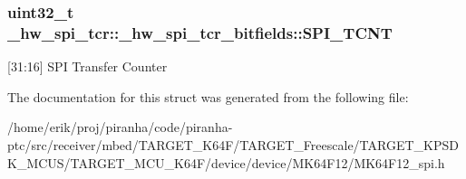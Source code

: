 \subsubsection[{\texorpdfstring{S\+P\+I\+\_\+\+T\+C\+NT}{SPI_TCNT}}]{\setlength{\rightskip}{0pt plus 5cm}uint32\+\_\+t \+\_\+hw\+\_\+spi\+\_\+tcr\+::\+\_\+hw\+\_\+spi\+\_\+tcr\+\_\+bitfields\+::\+S\+P\+I\+\_\+\+T\+C\+NT}\hypertarget{struct__hw__spi__tcr_1_1__hw__spi__tcr__bitfields_af91777c4618d2714d2bb2e264abe715c}{}\label{struct__hw__spi__tcr_1_1__hw__spi__tcr__bitfields_af91777c4618d2714d2bb2e264abe715c}
\mbox{[}31\+:16\mbox{]} S\+PI Transfer Counter 

The documentation for this struct was generated from the following file\+:\begin{DoxyCompactItemize}
\item 
/home/erik/proj/piranha/code/piranha-\/ptc/src/receiver/mbed/\+T\+A\+R\+G\+E\+T\+\_\+\+K64\+F/\+T\+A\+R\+G\+E\+T\+\_\+\+Freescale/\+T\+A\+R\+G\+E\+T\+\_\+\+K\+P\+S\+D\+K\+\_\+\+M\+C\+U\+S/\+T\+A\+R\+G\+E\+T\+\_\+\+M\+C\+U\+\_\+\+K64\+F/device/device/\+M\+K64\+F12/M\+K64\+F12\+\_\+spi.\+h\end{DoxyCompactItemize}
